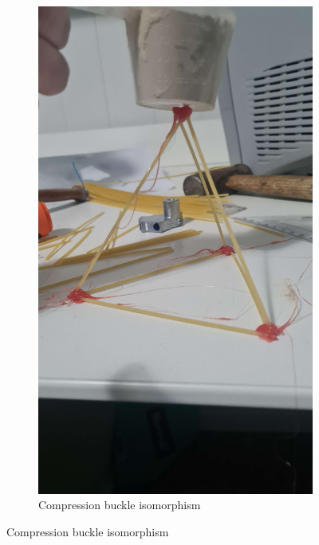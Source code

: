 \documentclass{report}
\newcommand{\subimgw}{.7\linewidth}
\begin{document}
\begin{figure}[H]
	\begin{subfigure}{.5\textwidth}
		\centering
		\includegraphics[width=\subimgw,trim={0 20cm 0 0},clip]{tetrehedra-a}
		\caption{Compression buckle isomorphism}


\end{subfigure}
\end{figure}
\end{document}
